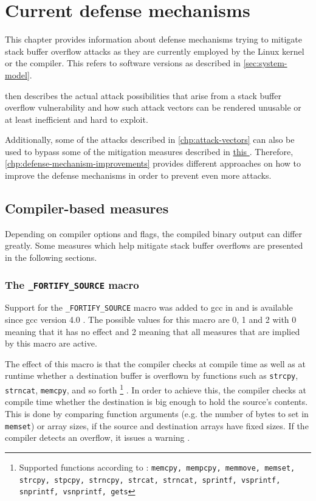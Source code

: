 \chapter{Current defense mechanisms}
\label{chp:current-defense-mechanisms}

This chapter provides information about defense mechanisms trying to mitigate stack buffer overflow attacks as they are currently employed by the Linux kernel or the compiler.
This refers to software versions as described in \cref{sec:system-model}.

 then describes the actual attack possibilities that arise from a stack buffer overflow vulnerability and how such attack vectors can be rendered unusable or at least inefficient and hard to exploit.

Additionally, some of the attacks described in \cref{chp:attack-vectors} can also be used to bypass some of the mitigation measures described in \hyperref[chp:current-defense-mechanisms]{this }.
Therefore, \cref{chp:defense-mechanism-improvements} provides different approaches on how to improve the defense mechanisms in order to prevent even more attacks.

\section{Compiler-based measures}
\label{sec:compiler-based-measures}

Depending on compiler options and flags, the compiled binary output can differ greatly.
Some measures which help mitigate stack buffer overflows are presented in the following sections.

\subsection{The \texttt{\_FORTIFY\_SOURCE} macro}
\label{subsec:fortify-source}

Support for the \texttt{\_FORTIFY\_SOURCE} macro was added to \gls{gcc} in  and is available since \gls{gcc} version 4.0 \cite{Sharma2014}.
The possible values for this macro are 0, 1 and 2 with 0 meaning that it has no effect and 2 meaning that all measures that are implied by this macro are active.

The effect of this macro is that the compiler checks at compile time as well as at runtime whether a destination buffer is overflown by functions such as \texttt{strcpy}, \texttt{strncat}, \texttt{memcpy}, and so forth%
	\footnote{Supported functions according to \cite{Kerrisk2020,Sharma2014}: \texttt{memcpy, mempcpy, memmove, memset, strcpy, stpcpy, strncpy, strcat, strncat, sprintf, vsprintf, snprintf, vsnprintf, gets}}%
.
In order to achieve this, the compiler checks at compile time whether the destination is big enough to hold the source's contents.
This is done by comparing function arguments (e.g. the number of bytes to set in \texttt{memset}) or array sizes, if the source and destination arrays have fixed sizes.
If the compiler detects an overflow, it issues a warning \cite{Jelinek2004,Kerrisk2020,Sharma2014,Sidhpurwala2018}.

